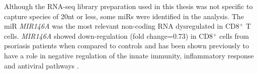 Although the RNA-seq library preparation used in this thesis was not specific to capture species of 20nt or less, some miRs were identified in the analysis. The miR \textit{MIR146A} was the most relevant non-coding RNA dysregulated in CD8$^+$ T cells. \textit{MIR146A} showed down-regulation (fold change=0.73) in CD8$^+$ cells from psoriasis patients when compared to controls and has been shown previously to have a role in negative regulation of the innate immunity, inflammatory response and antiviral pathways \parencite{Taganov2006}.






